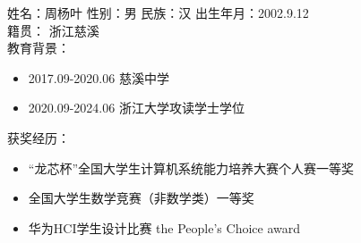 \cleardoublepage
{}
姓名：周杨叶 \qquad  性别：男  \qquad  民族：汉 \qquad 出生年月：2002.9.12\\
籍贯： 浙江慈溪\\
教育背景：
\begin{itemize}
\item 2017.09-2020.06 \quad 慈溪中学
\item 2020.09-2024.06 \quad 浙江大学攻读学士学位
\end{itemize}
获奖经历：
\begin{itemize}
\item “龙芯杯”全国大学生计算机系统能力培养大赛个人赛一等奖
\item 全国大学生数学竞赛（非数学类）一等奖
\item 华为HCI学生设计比赛 the People's Choice award
\end{itemize}

